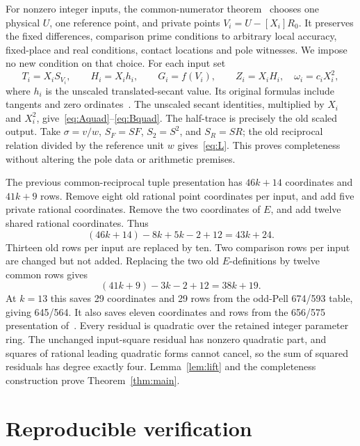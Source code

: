 \documentclass[11pt]{article}
\begin{document}
For nonzero integer inputs, the common-numerator theorem~\cite{common}
chooses one physical \(U\), one reference point, and private points
\(V_i=U-[X_i]R_0\). It preserves the fixed differences, comparison
prime conditions to arbitrary local accuracy, fixed-place and real
conditions, contact locations and pole witnesses. We impose no new
condition on that choice. For each input set
\[
 T_i=X_iS_{V_i},\qquad H_i=X_ih_i,\qquad G_i=f(V_i),
 \qquad Z_i=X_iH_i,\quad \omega_i=c_iX_i^2,
\]
where \(h_i\) is the unscaled translated-secant value. Its original
formulas include tangents and zero ordinates~\cite{unscaled,secant}.
The unscaled secant identities, multiplied by \(X_i\) and \(X_i^2\),
give~\eqref{eq:Aquad}--\eqref{eq:Bquad}. The half-trace is precisely
the old scaled output. Take \(\sigma=v/w\), \(S_F=SF\),
\(S_2=S^2\), and \(S_R=SR\); the old reciprocal relation divided
by the reference unit \(w\) gives~\eqref{eq:L}. This proves
completeness without altering the pole data or arithmetic premises.

The previous common-reciprocal tuple presentation has \(46k+14\)
coordinates and \(41k+9\) rows. Remove eight old rational point
coordinates per input, and add five private rational coordinates.
Remove the two coordinates of \(E\), and add twelve shared rational
coordinates. Thus
\[
             (46k+14)-8k+5k-2+12=43k+24.
\]
Thirteen old rows per input are replaced by ten. Two comparison rows
per input are changed but not added. Replacing the two old
\(E\)-definitions by twelve common rows gives
\[
                       (41k+9)-3k-2+12=38k+19.
\]
At \(k=13\) this saves 29 coordinates and 29 rows from the odd-Pell
674/593 table, giving 645/564. It also saves eleven coordinates and
rows from the 656/575 presentation of~\cite{unscaled}. Every residual
is quadratic over the retained integer parameter ring. The unchanged
input-square residual has nonzero quadratic part, and squares of
rational leading quadratic forms cannot cancel, so the sum of squared
residuals has degree exactly four. Lemma~\ref{lem:lift} and the
completeness construction prove Theorem~\ref{thm:main}.

\section{Reproducible verification}
\end{document}
